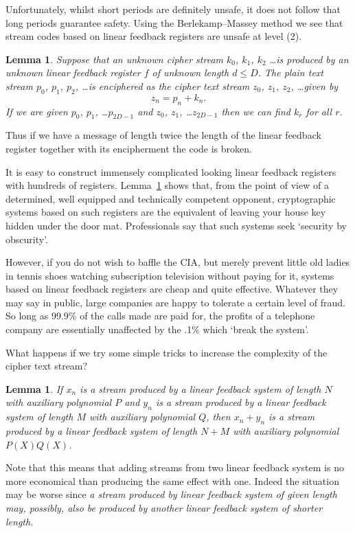 \documentclass[12pt,a4paper]{article}
\theoremstyle{plain}
\newtheorem{lemma}[theorem]{Lemma}
\theoremstyle{definition}
\begin{document}
    Unfortunately, whilst short periods are definitely
    unsafe, it does not follow that long periods
    guarantee safety. Using the
    Berlekamp--Massey method we see that stream
    codes based on linear feedback registers
    are unsafe at level (2).
    \begin{lemma}
        \label{can opener}
        Suppose that an unknown
        \emph{cipher stream} $k_{0}$, $k_{1}$,
        $k_{2}$ \dots is produced by an
        unknown linear feedback
        register $f$ of unknown length $d\leq D$.
        The \emph{plain text stream}
        $p_{0}$, $p_{1}$, $p_{2}$, \dots is enciphered
        as the \emph{cipher text stream}
        $z_{0}$, $z_{1}$, $z_{2}$, \dots  given by
        \[z_{n}=p_{n}+k_{n}.\]
        If we are given $p_{0}$, $p_{1}$, \dots $p_{2D-1}$
        and $z_{0}$, $z_{1}$, \dots $z_{2D-1}$
        then we can find $k_{r}$ for all $r$.
    \end{lemma}
    Thus if we have a message of length twice the
    length of the linear feedback register
    together with its encipherment the code
    is broken.

    It is easy to construct immensely complicated looking
    linear feedback registers with hundreds of registers.
    Lemma~\ref{can opener}
    shows that, from the point of view of a determined,
    well equipped and technically competent
    opponent, cryptographic systems based on such registers
    are the equivalent of leaving your house key hidden
    under the door mat.
    Professionals say that such systems seek `security
    by obscurity'.

    However, if you do not wish
    to baffle the CIA, but merely prevent little old
    ladies in tennis shoes watching subscription
    television without paying for it, systems
    based on linear feedback registers are cheap
    and quite effective. Whatever they may say in public,
    large companies are happy to tolerate a certain level
    of fraud. So long as 99.9\% of the calls made are
    paid for, the profits of a telephone company are
    essentially unaffected by the .1\% which `break the
    system'.


    What happens if we try some simple tricks
    to increase the complexity of the
    cipher text stream?
    \begin{lemma}
        \label{clown one}
        If $x_{n}$ is a stream
        produced by a linear feedback system of length $N$
        with auxiliary
        polynomial $P$ and $y_{n}$  is a stream
        produced by a linear feedback system of length $M$
        with auxiliary polynomial $Q$,
        then $x_{n}+y_{n}$ is a stream
        produced by a linear feedback system of length $N+M$
        with auxiliary polynomial $P(X)Q(X)$.
    \end{lemma}
    \noindent Note that this means that adding streams
    from two linear feedback system
    is no more economical than producing
    the same effect with one. Indeed the situation
    may be worse since \emph{a stream produced by
    linear feedback system of given length may, possibly,
    also be produced by another linear feedback system
    of shorter length}.
\end{document}
